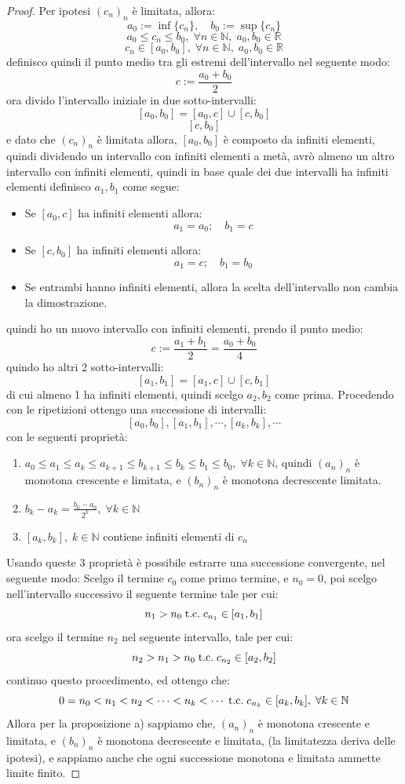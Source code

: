 \documentclass[a4paper,12pt,openright]{book}
\begin{document}
	\begin{proof}
		Per ipotesi $(c_n)_n$ è limitata, allora:
		\[a_0 := \inf \{c_n\}, \quad b_0 := \sup \{c_n\}\]
		\[a_0 \leq c_n \leq b_0, \; \forall n \in \mathbb{N}, \; a_0, b_0 \in \mathbb{R}\]
		\[c_n \in [a_0, b_0], \; \forall n \in \mathbb{N}, \; a_0, b_0 \in \mathbb{R}\]
		definisco quindi il punto medio tra gli estremi dell'intervallo nel seguente modo:
		\[c := \frac{a_0 + b_0}{2}\]
		ora divido l'intervallo iniziale in due sotto-intervalli:
		\[[a_0, b_0] = [a_0, c] \cup [c, b_0]\]
		\[[c, b_0]\]
		e dato che $(c_n)_n$ è limitata allora, $[a_0, b_0]$ è composto da infiniti elementi, quindi dividendo un intervallo con infiniti elementi a metà, avrò almeno un altro intervallo con infiniti elementi, quindi in base quale dei due intervalli ha infiniti elementi definisco $a_1, b_1$ come segue:
		\begin{itemize}
			\item Se $[a_0, c]$ ha infiniti elementi allora:
			\[a_1 = a_0; \quad b_1 = c\]
			\item Se $[c, b_0]$ ha infiniti elementi allora:
			\[a_1 = c; \quad b_1 = b_0\]
			\item Se entrambi hanno infiniti elementi, allora la scelta dell'intervallo non cambia la dimostrazione.
		\end{itemize}
		quindi ho un nuovo intervallo con infiniti elementi, prendo il punto medio:
		\[c :=  \frac{a_1 + b_1}{2} = \frac{a_0 + b_0}{4}\]
		quindo ho altri 2 sotto-intervalli:
		\[[a_1, b_1] = [a_1, c] \cup [c, b_1]\]
		di cui almeno 1 ha infiniti elementi, quindi scelgo $a_2, b_2$ come prima.
		Procedendo con le ripetizioni ottengo una successione di intervalli:
		\[[a_0, b_0], [a_1, b_1], \cdots, [a_k, b_k], \cdots\]
		con le seguenti proprietà:
		\begin{enumerate}[label=\alph*)]
			\item $a_0 \leq a_1 \leq a_k \leq a_{k + 1} \leq b_{k + 1} \leq b_k \leq b_1 \leq b_0, \; \forall k \in \mathbb{N}$, quindi $(a_n)_n$ è monotona crescente e limitata, e $(b_n)_n$ è monotona decrescente limitata.
			\item $b_k - a_k = \frac{b_0 - a_0}{2^k}, \; \forall k \in \mathbb{N}$
			\item $[a_k, b_k], \; k \in \mathbb{N}$ contiene infiniti elementi di $c_n$
		\end{enumerate}
		Usando queste 3 proprietà è possibile estrarre una successione convergente, nel seguente modo:
		Scelgo il termine $c_0$ come primo termine, e $n_0 = 0$, poi scelgo nell'intervallo successivo il seguente termine tale per cui:
		\[n_1 > n_0 \;\text{t.c.}\; c_{n_1} \in [a_1, b_1]\]
		ora scelgo il termine $n_2$ nel seguente intervallo, tale per cui:
		\[n_2 > n_1 > n_0 \;\text{t.c.}\; c_{n_2} \in [a_2, b_2]\]
		continuo questo procedimento, ed ottengo che:
		\[0 = n_0 < n_1 < n_2 < \cdots < n_k < \cdots \;\text{t.c.}\; c_{n_k} \in [a_k, b_k], \; \forall k \in \mathbb{N}\]
		Allora per la proposizione a) sappiamo che, $(a_n)_n$ è monotona crescente e limitata, e $(b_n)_n$ è monotona decrescente e limitata, (la limitatezza deriva delle ipotesi), e sappiamo anche che ogni successione monotona e limitata ammette limite finito.
		

\end{proof}
\end{document}
